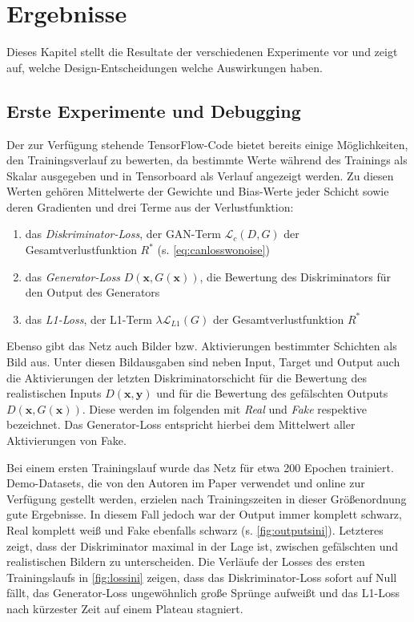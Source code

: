 \chapter{Ergebnisse}

Dieses Kapitel stellt die Resultate der verschiedenen Experimente vor und zeigt auf, welche Design-Entscheidungen welche Auswirkungen haben.



\section{Erste Experimente und Debugging}

Der zur Verfügung stehende TensorFlow-Code bietet bereits einige Möglichkeiten, den Trainingsverlauf zu bewerten, da bestimmte Werte während des Trainings als Skalar ausgegeben und in Tensorboard als Verlauf angezeigt werden.
Zu diesen Werten gehören Mittelwerte der Gewichte und Bias-Werte jeder Schicht sowie deren Gradienten und drei Terme aus der Verlustfunktion:

\begin{enumerate}
	\item das \emph{Diskriminator-Loss}, der GAN-Term $ \mathcal{L}_c(D, G) $ der Gesamtverlustfunktion $ R^* $ (s. \autoref{eq:canlosswonoise})
	\item das \emph{Generator-Loss} $ D(\mathbf{x}, G(\mathbf{x})) $, die Bewertung des Diskriminators für den Output des Generators
	\item das \emph{L1-Loss}, der L1-Term $ \lambda \mathcal{L}_{L1}(G) $ der Gesamtverlustfunktion $ R^* $
\end{enumerate}

Ebenso gibt das Netz auch Bilder bzw. Aktivierungen bestimmter Schichten als Bild aus.
Unter diesen Bildausgaben sind neben Input, Target und Output auch die Aktivierungen der letzten Diskriminatorschicht für die Bewertung des realistischen Inputs $ D(\mathbf{x}, \mathbf{y}) $ und für die Bewertung des gefälschten Outputs $ D(\mathbf{x}, G(\mathbf{x})) $.
Diese werden im folgenden mit \emph{Real} und \emph{Fake} respektive bezeichnet.
Das Generator-Loss entspricht hierbei dem Mittelwert aller Aktivierungen von Fake.

Bei einem ersten Trainingslauf wurde das Netz für etwa 200 Epochen trainiert.
Demo-Datasets, die von den Autoren im Paper verwendet und online zur Verfügung gestellt werden, erzielen nach Trainingszeiten in dieser Größenordnung gute Ergebnisse.
In diesem Fall jedoch war der Output immer komplett schwarz, Real komplett weiß und Fake ebenfalls schwarz (s. \autoref{fig:outputsini}).
Letzteres zeigt, dass der Diskriminator maximal in der Lage ist, zwischen gefälschten und realistischen Bildern zu unterscheiden.
Die Verläufe der Losses des ersten Trainingslaufs in \autoref{fig:lossini} zeigen, dass das Diskriminator-Loss sofort auf Null fällt, das Generator-Loss ungewöhnlich große Sprünge aufweißt und das L1-Loss nach kürzester Zeit auf einem Plateau stagniert.

